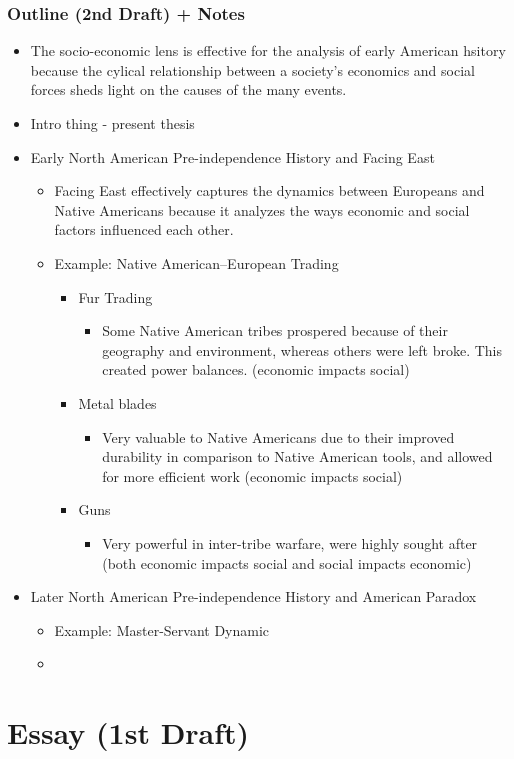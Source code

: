 \documentclass[letterpaper]{article}
\begin{document}
\subsubsection{Outline (2nd Draft) + Notes}
\label{sec:org11e2c13}
\begin{itemize}
\item The socio-economic lens is effective for the analysis of early
American hsitory because the cylical relationship between a society's
economics and social forces sheds light on the causes of the many
events.

\item Intro thing - present thesis
\item Early North American Pre-independence History and Facing East

\begin{itemize}
\item Facing East effectively captures the dynamics between Europeans and
Native Americans because it analyzes the ways economic and social
factors influenced each other.
\item Example: Native American--European Trading

\begin{itemize}
\item Fur Trading

\begin{itemize}
\item Some Native American tribes prospered because of their
geography and environment, whereas others were left broke. This
created power balances. (economic impacts social)
\end{itemize}

\item Metal blades

\begin{itemize}
\item Very valuable to Native Americans due to their improved
durability in comparison to Native American tools, and allowed
for more efficient work (economic impacts social)
\end{itemize}

\item Guns

\begin{itemize}
\item Very powerful in inter-tribe warfare, were highly sought after
(both economic impacts social and social impacts economic)
\end{itemize}
\end{itemize}
\end{itemize}

\item Later North American Pre-independence History and American Paradox

\begin{itemize}
\item Example: Master-Servant Dynamic
\item 
\end{itemize}
\end{itemize}

\section{Essay (1st Draft)}
\label{sec:org817daa2}
\end{document}
